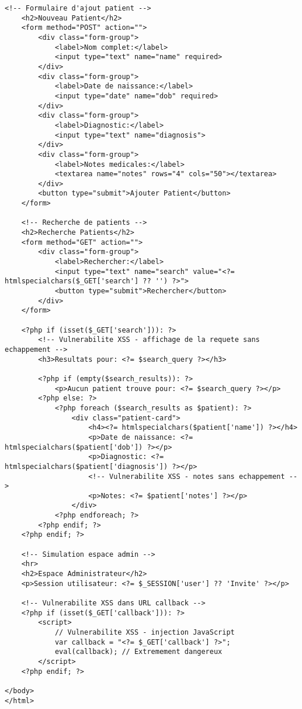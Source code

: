 \begin{lstlisting}[style=bashstyle,caption=Application web medicale vulnerable pour tests XSS]
    <!-- Formulaire d'ajout patient -->
    <h2>Nouveau Patient</h2>
    <form method="POST" action="">
        <div class="form-group">
            <label>Nom complet:</label>
            <input type="text" name="name" required>
        </div>
        <div class="form-group">
            <label>Date de naissance:</label>
            <input type="date" name="dob" required>
        </div>
        <div class="form-group">
            <label>Diagnostic:</label>
            <input type="text" name="diagnosis">
        </div>
        <div class="form-group">
            <label>Notes medicales:</label>
            <textarea name="notes" rows="4" cols="50"></textarea>
        </div>
        <button type="submit">Ajouter Patient</button>
    </form>
    
    <!-- Recherche de patients -->
    <h2>Recherche Patients</h2>
    <form method="GET" action="">
        <div class="form-group">
            <label>Rechercher:</label>
            <input type="text" name="search" value="<?= htmlspecialchars($_GET['search'] ?? '') ?>">
            <button type="submit">Rechercher</button>
        </div>
    </form>
    
    <?php if (isset($_GET['search'])): ?>
        <!-- Vulnerabilite XSS - affichage de la requete sans echappement -->
        <h3>Resultats pour: <?= $search_query ?></h3>
        
        <?php if (empty($search_results)): ?>
            <p>Aucun patient trouve pour: <?= $search_query ?></p>
        <?php else: ?>
            <?php foreach ($search_results as $patient): ?>
                <div class="patient-card">
                    <h4><?= htmlspecialchars($patient['name']) ?></h4>
                    <p>Date de naissance: <?= htmlspecialchars($patient['dob']) ?></p>
                    <p>Diagnostic: <?= htmlspecialchars($patient['diagnosis']) ?></p>
                    <!-- Vulnerabilite XSS - notes sans echappement -->
                    <p>Notes: <?= $patient['notes'] ?></p>
                </div>
            <?php endforeach; ?>
        <?php endif; ?>
    <?php endif; ?>
    
    <!-- Simulation espace admin -->
    <hr>
    <h2>Espace Administrateur</h2>
    <p>Session utilisateur: <?= $_SESSION['user'] ?? 'Invite' ?></p>
    
    <!-- Vulnerabilite XSS dans URL callback -->
    <?php if (isset($_GET['callback'])): ?>
        <script>
            // Vulnerabilite XSS - injection JavaScript
            var callback = "<?= $_GET['callback'] ?>";
            eval(callback); // Extremement dangereux
        </script>
    <?php endif; ?>
    
</body>
</html>
\end{lstlisting}

